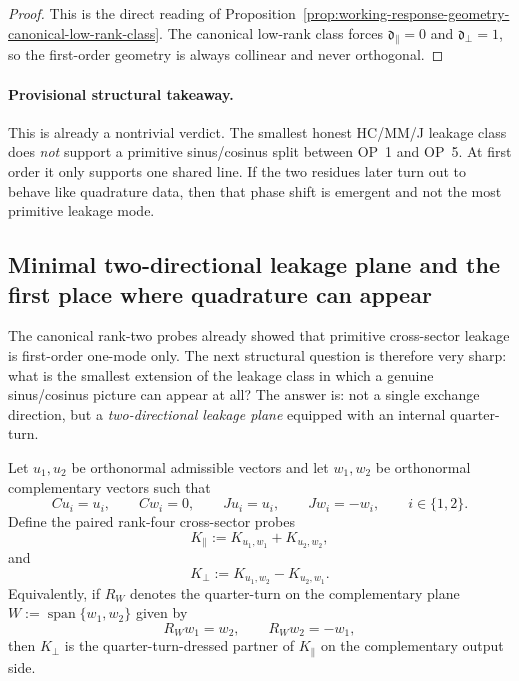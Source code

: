 \begin{proof}
This is the direct reading of Proposition~\ref{prop:working-response-geometry-canonical-low-rank-class}. The canonical low-rank class forces $\mathfrak d_{\parallel}=0$ and $\mathfrak d_{\perp}=1$, so the first-order geometry is always collinear and never orthogonal.
\end{proof}

\paragraph{Provisional structural takeaway.}
This is already a nontrivial verdict. The smallest honest HC/MM/J leakage class does \emph{not} support a primitive sinus/cosinus split between OP~1 and OP~5. At first order it only supports one shared line. If the two residues later turn out to behave like quadrature data, then that phase shift is emergent and not the most primitive leakage mode.

\subsection*{Minimal two-directional leakage plane and the first place where quadrature can appear}
The canonical rank-two probes already showed that primitive cross-sector leakage is first-order one-mode only. The next structural question is therefore very sharp: what is the smallest extension of the leakage class in which a genuine sinus/cosinus picture can appear at all? The answer is: not a single exchange direction, but a \emph{two-directional leakage plane} equipped with an internal quarter-turn.

\begin{definition}
\label{def:working-minimal-two-directional-leakage-plane}
Let $u_1,u_2$ be orthonormal admissible vectors and let $w_1,w_2$ be orthonormal complementary vectors such that
\[
 Cu_i=u_i,
 \qquad
 Cw_i=0,
 \qquad
 Ju_i=u_i,
 \qquad
 Jw_i=-w_i,
 \qquad i\in\{1,2\}.
\]
Define the paired rank-four cross-sector probes
\[
 K_{\parallel} := K_{u_1,w_1}+K_{u_2,w_2},
\]
and
\[
 K_{\perp} := K_{u_1,w_2}-K_{u_2,w_1}.
\]
Equivalently, if $R_W$ denotes the quarter-turn on the complementary plane $W:=\operatorname{span}\{w_1,w_2\}$ given by
\[
 R_W w_1=w_2,
 \qquad
 R_W w_2=-w_1,
\]
then $K_{\perp}$ is the quarter-turn-dressed partner of $K_{\parallel}$ on the complementary output side.
\end{definition}

